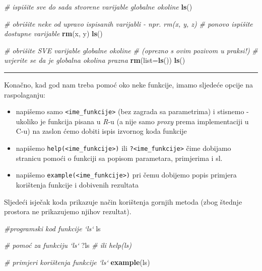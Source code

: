 \documentclass[]{book}
\newenvironment{Shaded}{\begin{snugshade}}{\end{snugshade}}
\newcommand{\KeywordTok}[1]{\textcolor[rgb]{0.13,0.29,0.53}{\textbf{#1}}}
\newcommand{\DataTypeTok}[1]{\textcolor[rgb]{0.13,0.29,0.53}{#1}}
\newcommand{\CommentTok}[1]{\textcolor[rgb]{0.56,0.35,0.01}{\textit{#1}}}
\newcommand{\NormalTok}[1]{#1}
\providecommand{\tightlist}{%
  \setlength{\itemsep}{0pt}\setlength{\parskip}{0pt}}
\theoremstyle{definition}
\theoremstyle{definition}
\theoremstyle{definition}
\theoremstyle{remark}
\begin{document}
\begin{Shaded}
\begin{Highlighting}[]
\CommentTok{# ispišite sve do sada stvorene varijable globalne okoline}
\KeywordTok{ls}\NormalTok{()}

\CommentTok{# obrišite neke od upravo ispisanih varijabli - npr. rm(x, y, z)}
\CommentTok{# ponovo ispišite dostupne varijable}
\KeywordTok{rm}\NormalTok{(x, y)}
\KeywordTok{ls}\NormalTok{()}

\CommentTok{# obrišite SVE varijable globalne okoline}
\CommentTok{# (oprezno s ovim pozivom u praksi!)}
\CommentTok{# uvjerite se da je globalna okolina prazna}
\KeywordTok{rm}\NormalTok{(}\DataTypeTok{list=}\KeywordTok{ls}\NormalTok{())}
\KeywordTok{ls}\NormalTok{()}
\end{Highlighting}
\end{Shaded}

\begin{center}\rule{0.5\linewidth}{\linethickness}\end{center}

Konačno, kad god nam treba pomoć oko neke funkcije, imamo sljedeće
opcije na raspolaganju:

\begin{itemize}
\tightlist
\item
  napišemo samo \texttt{\textless{}ime\_funkcije\textgreater{}} (bez
  zagrada sa parametrima) i stisnemo \emph{} - ukoliko je funkcija
  pisana u \emph{R}-u (a nije samo \emph{proxy} prema implementaciji u
  C-u) na zaslon ćemo dobiti ispis izvornog koda funkcije
\item
  napišemo \texttt{help(\textless{}ime\_funkcije\textgreater{})} ili
  \texttt{?\textless{}ime\_funkcije\textgreater{}} čime dobijamo
  stranicu pomoći o funkciji sa popisom parametara, primjerima i sl.
\item
  napišemo \texttt{example(\textless{}ime\_funkcije\textgreater{})} pri
  čemu dobijemo popis primjera korištenja funkcije i dobivenih rezultata
\end{itemize}

Sljedeći isječak koda prikazuje način korištenja gornjih metoda (zbog
štednje prostora ne prikazujemo njihov rezultat).

\begin{Shaded}
\begin{Highlighting}[]
\CommentTok{#programski kod funkcije `ls`}
\NormalTok{ls}

\CommentTok{# pomoć za funkciju `ls`}
\NormalTok{?ls    }\CommentTok{# ili help(ls)}

\CommentTok{# primjeri korištenja funkcije `ls`}
\KeywordTok{example}\NormalTok{(ls)}
\end{Highlighting}
\end{Shaded}
\end{document}
